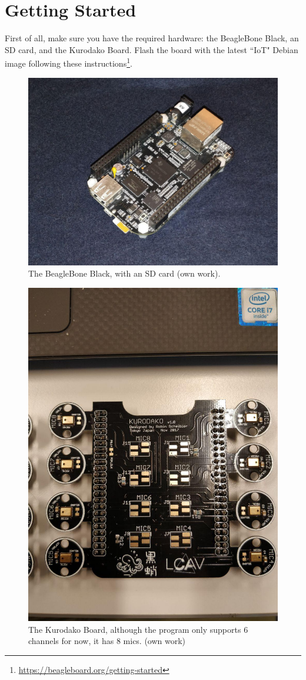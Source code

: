 \documentclass[]{report}
\begin{document}
\hypertarget{getting-started}{%
\section{Getting Started}\label{getting-started}}

First of all, make sure you have the required hardware: the BeagleBone
Black, an SD card, and the Kurodako Board. Flash the board with the
latest ``IoT" Debian image following these instructions\footnote{\url{https://beagleboard.org/getting-started}}.

\begin{figure}[H]
\centering
\includegraphics[width=0.9\linewidth]{Pictures/BBB.jpg}
\caption{The BeagleBone Black, with an SD card (own work).}
\end{figure}

\begin{figure}[H]
\centering
\includegraphics[width=0.4\linewidth]{Pictures/kurodako.jpg}
\caption{The Kurodako Board, although the program only supports 6
channels for now, it has 8 mics. (own work)}
\end{figure}
\end{document}
